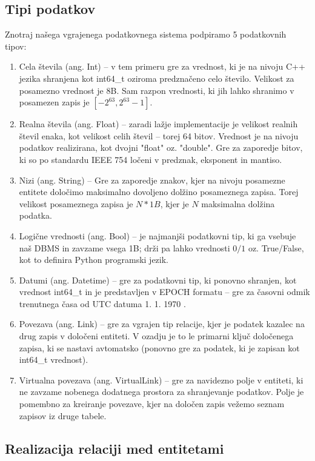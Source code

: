 \documentclass[a4paper,12pt,openright]{book}
\begin{document}
        \subsection{Tipi podatkov}
        Znotraj našega vgrajenega podatkovnega sistema podpiramo 5 podatkovnih tipov:
        \begin{enumerate}
            \item Cela števila (ang. Int) – v tem primeru gre za vrednost, ki je na nivoju C++ jezika shranjena kot int64\_t oziroma predznačeno celo število. Velikost za posamezno vrednost je 8B. Sam razpon vrednosti, ki jih lahko shranimo v posamezen zapis je $[-2^{63}, 2^{63} - 1]$.
            \item Realna števila (ang. Float) – zaradi lažje implementacije je velikost realnih števil enaka, kot velikost celih števil – torej 64 bitov. Vrednost je na nivoju podatkov realizirana, kot dvojni "float" oz. "double". Gre za zaporedje bitov, ki so po standardu IEEE 754 \cite{kahan1996ieee} ločeni v predznak, eksponent in mantiso.
            \item Nizi (ang. String) – Gre za zaporedje znakov, kjer na nivoju posamezne entitete določimo maksimalno dovoljeno dolžino posameznega zapisa. Torej velikost posameznega zapisa je $N * 1B$, kjer je $N$ maksimalna dolžina podatka. 
            \item Logične vrednosti (ang. Bool) – je najmanjši podatkovni tip, ki ga vsebuje naš DBMS in zavzame vsega 1B; drži pa lahko vrednosti $0/1$ oz. True/False, kot to definira Python programski jezik.
            \item Datumi (ang. Datetime) – gre za podatkovni tip, ki ponovno shranjen, kot vrednost int64\_t in je predstavljen v EPOCH formatu – gre za časovni odmik trenutnega časa od UTC datuma 1. 1. 1970 \cite{EPOCH_FORMAT}. 
            \item Povezava (ang. Link) – gre za vgrajen tip relacije, kjer je podatek kazalec na drug zapis v določeni entiteti. V ozadju je to le primarni ključ določenega zapisa, ki se nastavi avtomatsko (ponovno gre za podatek, ki je zapisan kot int64\_t vrednost).
            \item Virtualna povezava (ang. VirtualLink) – gre za navidezno polje v entiteti, ki ne zavzame nobenega dodatnega prostora za shranjevanje podatkov. Polje je pomembno za kreiranje povezave, kjer na določen zapis vežemo seznam zapisov iz druge tabele.  
        \end{enumerate}
        
        \subsection{Realizacija relaciji med entitetami}
\end{document}
